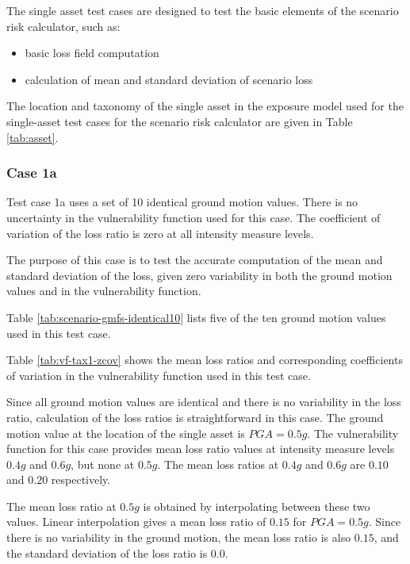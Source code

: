 The single asset test cases are designed to test the basic elements of the scenario risk calculator, such as:

\begin{itemize}
\item basic loss field computation
\item calculation of mean and standard deviation of scenario loss
\end{itemize}



The location and taxonomy of the single asset in the exposure model used for the single-asset test cases for the scenario risk calculator are given in Table \ref{tab:asset}.

\subsubsection{Case 1a}
Test case 1a uses a set of 10 identical ground motion values. There is no uncertainty in the vulnerability function used for this case. The coefficient of variation of the loss ratio is zero at all intensity measure levels.

The purpose of this case is to test the accurate computation of the mean and standard deviation of the loss, given zero variability in both the ground motion values and in the vulnerability function.



Table \ref{tab:scenario-gmfs-identical10} lists five of the ten ground motion values used in this test case.



Table \ref{tab:vf-tax1-zcov} shows the mean loss ratios and corresponding coefficients of variation in the vulnerability function used in this test case.

Since all ground motion values are identical and there is no variability in the loss ratio, calculation of the loss ratios is straightforward in this case. The ground motion value at the location of the single asset is $PGA = 0.5 g$. The vulnerability function for this case provides mean loss ratio values at intensity measure levels $0.4 g$ and $0.6 g$, but none at $0.5 g$. The mean loss ratios at $0.4 g$ and $0.6 g$ are $0.10$ and $0.20$ respectively.

The mean loss ratio at $0.5 g$ is obtained by interpolating between these two values. Linear interpolation gives a mean loss ratio of $0.15$ for $PGA = 0.5 g$. Since there is no variability in the ground motion, the mean loss ratio is also $0.15$, and the standard deviation of the loss ratio is $0.0$.

